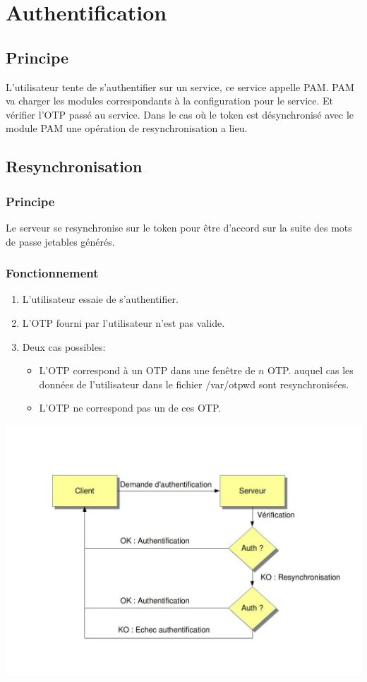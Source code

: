 \documentclass{"../../res/univ-projet"}
\begin{document}
\section{Authentification}
\subsection{Principe}
L'utilisateur tente de s'authentifier sur un service, ce service appelle PAM. 
PAM va charger les modules correspondants à la configuration pour le service.
Et vérifier l'OTP passé au service. Dans le cas où le token est désynchronisé
avec le module PAM une opération de resynchronisation a lieu.

\subsection{Resynchronisation}
\subsubsection{Principe}
Le serveur se resynchronise sur le token pour être d'accord sur la suite des
mots de passe jetables générés.

\subsubsection{Fonctionnement}
\begin{enumerate}
    \item L'utilisateur essaie de s'authentifier.
    \item L'OTP fourni par l'utilisateur n'est pas valide.
    \item Deux cas possibles:
    \begin{itemize}
    	\item L'OTP correspond à un OTP dans une fenêtre de $n$ OTP.
    		auquel cas les données de l'utilisateur dans le fichier
    		/var/otpwd sont resynchronisées.
    	\item L'OTP ne correspond pas un de ces OTP.
    \end{itemize}
\end{enumerate}
\includegraphics[width=\textwidth]{../graphics/resynchronisation.jpg}
\end{document}
